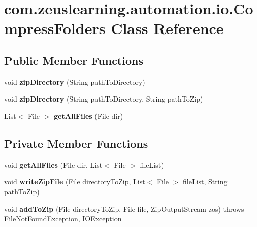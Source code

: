 \hypertarget{classcom_1_1zeuslearning_1_1automation_1_1io_1_1CompressFolders}{}\section{com.\+zeuslearning.\+automation.\+io.\+Compress\+Folders Class Reference}
\label{classcom_1_1zeuslearning_1_1automation_1_1io_1_1CompressFolders}
\subsection*{Public Member Functions}
\begin{DoxyCompactItemize}
\item 
\hypertarget{classcom_1_1zeuslearning_1_1automation_1_1io_1_1CompressFolders_aec7be1d662868016e52989e38e5ca68d}{}\label{classcom_1_1zeuslearning_1_1automation_1_1io_1_1CompressFolders_aec7be1d662868016e52989e38e5ca68d} 
void {\bfseries zip\+Directory} (String path\+To\+Directory)
\item 
\hypertarget{classcom_1_1zeuslearning_1_1automation_1_1io_1_1CompressFolders_acb34bd4bf66d7bd227978a4c5f4b00d5}{}\label{classcom_1_1zeuslearning_1_1automation_1_1io_1_1CompressFolders_acb34bd4bf66d7bd227978a4c5f4b00d5} 
void {\bfseries zip\+Directory} (String path\+To\+Directory, String path\+To\+Zip)
\item 
\hypertarget{classcom_1_1zeuslearning_1_1automation_1_1io_1_1CompressFolders_ad2440bc43e77910f11ac231bf02e6c57}{}\label{classcom_1_1zeuslearning_1_1automation_1_1io_1_1CompressFolders_ad2440bc43e77910f11ac231bf02e6c57} 
List$<$ File $>$ {\bfseries get\+All\+Files} (File dir)
\end{DoxyCompactItemize}
\subsection*{Private Member Functions}
\begin{DoxyCompactItemize}
\item 
\hypertarget{classcom_1_1zeuslearning_1_1automation_1_1io_1_1CompressFolders_a2cef2844b35cb7acb902b70a71c5a9a7}{}\label{classcom_1_1zeuslearning_1_1automation_1_1io_1_1CompressFolders_a2cef2844b35cb7acb902b70a71c5a9a7} 
void {\bfseries get\+All\+Files} (File dir, List$<$ File $>$ file\+List)
\item 
\hypertarget{classcom_1_1zeuslearning_1_1automation_1_1io_1_1CompressFolders_a2471e34a54fe8c993c233b8a20d5ce0b}{}\label{classcom_1_1zeuslearning_1_1automation_1_1io_1_1CompressFolders_a2471e34a54fe8c993c233b8a20d5ce0b} 
void {\bfseries write\+Zip\+File} (File directory\+To\+Zip, List$<$ File $>$ file\+List, String path\+To\+Zip)
\item 
\hypertarget{classcom_1_1zeuslearning_1_1automation_1_1io_1_1CompressFolders_a1120852b4ca11fd0b88caaa793bbda23}{}\label{classcom_1_1zeuslearning_1_1automation_1_1io_1_1CompressFolders_a1120852b4ca11fd0b88caaa793bbda23} 
void {\bfseries add\+To\+Zip} (File directory\+To\+Zip, File file, Zip\+Output\+Stream zos)  throws File\+Not\+Found\+Exception, I\+O\+Exception 
\end{DoxyCompactItemize}


